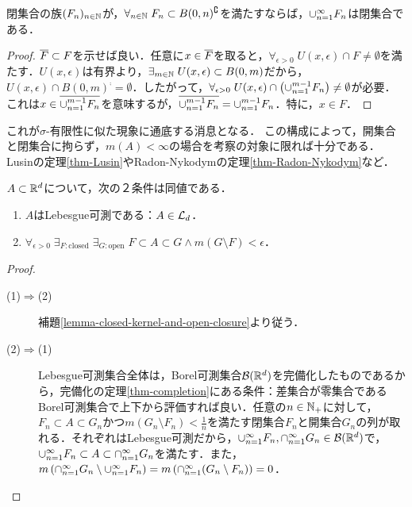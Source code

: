 \documentclass[uplatex, dvipdfmx]{jsreport}
\renewcommand{\B}{\mathcal{B}}
\begin{document}
\begin{lemma}[位相空間論の補足]\label{lemma-general-topology}
    閉集合の族$(F_n)_{n\in\mathbb{N}}$が，$\forall_{n\in\mathbb{N}}\;F_n\subset B(0,n)^\complement$を満たすならば，$\cup_{n=1}^\infty F_n$は閉集合である．
\end{lemma}
\begin{proof}
    $\overline{F}\subset F$を示せば良い．任意に$x\in\overline{F}$を取ると，$\forall_{\epsilon>0}\;U(x,\epsilon)\cap F\ne\emptyset$を満たす．$U(x,\epsilon)$は有界より，$\exists_{m\in\mathbb{N}}\;U(x,\epsilon)\subset B(0,m)$だから，$U(x,\epsilon)\cap B(0,m)^\comp=\emptyset$．したがって，$\forall_{\epsilon>0}\;U(x,\epsilon)\cap\left(\cup_{n=1}^{m-1}F_n\right)\ne\emptyset$が必要．これは$x\in\overline{\cup_{n=1}^{m-1}F_n}$を意味するが，$\overline{\cup_{n=1}^{m-1}F_n}=\cup_{n=1}^{m-1}F_n$．特に，$x\in F$．
\end{proof}
\begin{remarks}
    これが$\sigma$-有限性に似た現象に通底する消息となる．
    この構成によって，開集合と閉集合に拘らず，$m(A)<\infty$の場合を考察の対象に限れば十分である．
    Lusinの定理\ref{thm-Lusin}やRadon-Nykodymの定理\ref{thm-Radon-Nykodym}など．
\end{remarks}

\begin{theorem}[Lebesgue可測性の特徴付け]\label{thm-characterization-of-Lebesgue-measurableness}
    $A\subset\mathbb{R}^d$について，次の２条件は同値である．
    \begin{enumerate}
        \item $A$はLebesgue可測である：$A\in\mathcal{L}_d$．
        \item $\forall_{\epsilon>0}\;\exists_{F:\mathrm{closed}}\;\exists_{G:\mathrm{open}}\;F\subset A\subset G\land m(G\setminus F)<\epsilon$．
    \end{enumerate}
\end{theorem}
\begin{proof}\mbox{}
    \begin{description}
        \item[(1)$\Rightarrow$(2)] 補題\ref{lemma-closed-kernel-and-open-closure}より従う．
        \item[(2)$\Rightarrow$(1)] Lebesgue可測集合全体は，Borel可測集合$\B(\R^d)$を完備化したものであるから，完備化の定理\ref{thm-completion}にある条件：差集合が零集合であるBorel可測集合で上下から評価すれば良い．任意の$n\in\mathbb{N}_+$に対して，$F_n\subset A\subset G_n$かつ$m(G_n\setminus F_n)<\frac{1}{n}$を満たす閉集合$F_n$と開集合$G_n$の列が取れる．それぞれはLebesgue可測だから，$\cupn F_n,\capn G_n\in\B(\R^d)$で，
        $\cup_{n=1}^\infty F_n\subset A\subset\cap_{n=1}^\infty G_n$を満たす．また，$m\left(\cap_{n=1}^\infty G_n\setminus\cup_{n=1}^\infty F_n\right)=m\left(\cap_{n=1}^\infty(G_n\setminus F_n)\right)=0$．
    \end{description}
\end{proof}
\end{document}

